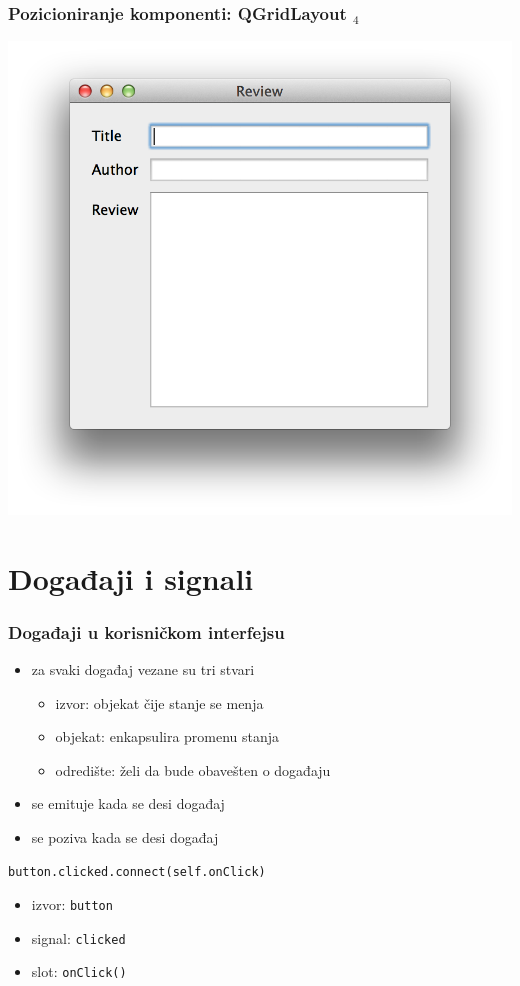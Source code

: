 \documentclass[utf8,compress,aspectratio=169]{beamer}
\begin{document}
\begin{frame}[fragile]
  \frametitle{Pozicioniranje komponenti: QGridLayout $_4$}
\begin{center}
\includegraphics[scale=0.5]{pyqt09.png}
\end{center}
\end{frame}

\section[Slots+Signals]{Događaji i signali}

\begin{frame}[fragile]
  \frametitle{Događaji u korisničkom interfejsu}
  \begin{itemize}
    \item za svaki događaj vezane su tri stvari
    \begin{itemize}
      \item izvor: objekat čije stanje se menja
      \item objekat: enkapsulira promenu stanja
      \item odredište: želi da bude obavešten o događaju
    \end{itemize}
    \item {} se emituje kada se desi događaj
    \item {} se poziva kada se desi događaj
  \end{itemize}
\begin{verbatim}
button.clicked.connect(self.onClick)
\end{verbatim}
  \begin{itemize}
    \item izvor: \texttt{button}
    \item signal: \texttt{clicked}
    \item slot: \texttt{onClick()}
  \end{itemize}
\end{frame}
\end{document}
